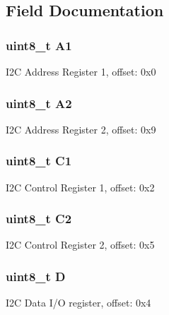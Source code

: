 \subsection{Field Documentation}
\hypertarget{struct_i2_c___mem_map_a3558a605337636043709e55b4bab69d6}{}
\subsubsection[{A1}]{\setlength{\rightskip}{0pt plus 5cm}uint8\+\_\+t A1}\label{struct_i2_c___mem_map_a3558a605337636043709e55b4bab69d6}
I2\+C Address Register 1, offset\+: 0x0 \hypertarget{struct_i2_c___mem_map_a2b058a256772b61e237f878a32937535}{}
\subsubsection[{A2}]{\setlength{\rightskip}{0pt plus 5cm}uint8\+\_\+t A2}\label{struct_i2_c___mem_map_a2b058a256772b61e237f878a32937535}
I2\+C Address Register 2, offset\+: 0x9 \hypertarget{struct_i2_c___mem_map_a8286c9d870f31a089d95e6a2285fbe2f}{}
\subsubsection[{C1}]{\setlength{\rightskip}{0pt plus 5cm}uint8\+\_\+t C1}\label{struct_i2_c___mem_map_a8286c9d870f31a089d95e6a2285fbe2f}
I2\+C Control Register 1, offset\+: 0x2 \hypertarget{struct_i2_c___mem_map_acdf8ac8ab339152eaed13f4eca300aa5}{}
\subsubsection[{C2}]{\setlength{\rightskip}{0pt plus 5cm}uint8\+\_\+t C2}\label{struct_i2_c___mem_map_acdf8ac8ab339152eaed13f4eca300aa5}
I2\+C Control Register 2, offset\+: 0x5 \hypertarget{struct_i2_c___mem_map_a42ede28e876dcdb2ce2ddd730de0401e}{}
\subsubsection[{D}]{\setlength{\rightskip}{0pt plus 5cm}uint8\+\_\+t D}\label{struct_i2_c___mem_map_a42ede28e876dcdb2ce2ddd730de0401e}
I2\+C Data I/\+O register, offset\+: 0x4 \hypertarget{struct_i2_c___mem_map_a576f877ccc2837ffe5811406404acad1}{}
